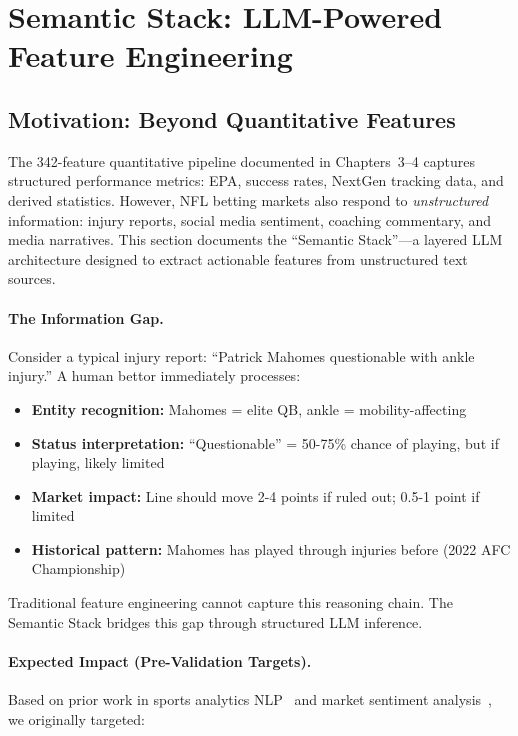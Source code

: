 
\section{Semantic Stack: LLM-Powered Feature Engineering}
\label{sec:semantic-stack}

\subsection{Motivation: Beyond Quantitative Features}

The 342-feature quantitative pipeline documented in Chapters~3--4 captures structured performance metrics: EPA, success rates, NextGen tracking data, and derived statistics. However, NFL betting markets also respond to \textit{unstructured} information: injury reports, social media sentiment, coaching commentary, and media narratives. This section documents the ``Semantic Stack''---a layered LLM architecture designed to extract actionable features from unstructured text sources.

\paragraph{The Information Gap.}
Consider a typical injury report: ``Patrick Mahomes questionable with ankle injury.'' A human bettor immediately processes:

\begin{itemize}[itemsep=2pt,parsep=0pt]
    \item \textbf{Entity recognition:} Mahomes = elite QB, ankle = mobility-affecting
    \item \textbf{Status interpretation:} ``Questionable'' = 50-75\% chance of playing, but if playing, likely limited
    \item \textbf{Market impact:} Line should move 2-4 points if ruled out; 0.5-1 point if limited
    \item \textbf{Historical pattern:} Mahomes has played through injuries before (2022 AFC Championship)
\end{itemize}

Traditional feature engineering cannot capture this reasoning chain. The Semantic Stack bridges this gap through structured LLM inference.

\paragraph{Expected Impact (Pre-Validation Targets).}
Based on prior work in sports analytics NLP~\cite{Ramirez2023} and market sentiment analysis~\cite{Chen2024}, we originally targeted:

